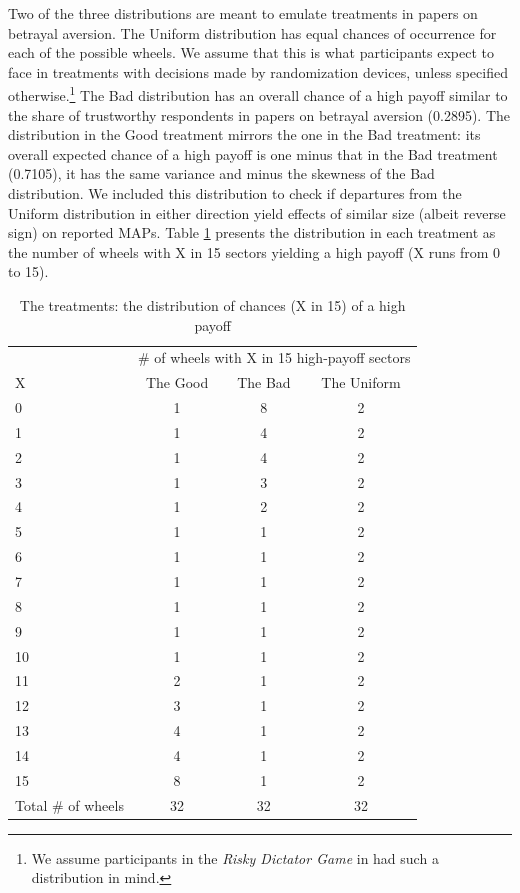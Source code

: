 Two of the three distributions are meant to emulate treatments in papers on betrayal aversion.
The Uniform distribution has equal chances of occurrence for each of the possible wheels.
We assume that this is what participants expect to face in treatments with decisions made by randomization devices, unless specified otherwise.\footnote{
We assume participants in the \textit{Risky Dictator Game} in \cite{Bohnet2004} had such a distribution in mind.
}
The Bad distribution has an overall chance of a high payoff similar to the share of trustworthy respondents in papers on betrayal aversion (0.2895).
The distribution in the Good treatment mirrors the one in the Bad treatment: its overall expected chance of a high payoff is one minus that in the Bad treatment (0.7105), it has the same variance and minus the skewness of the Bad distribution.
We included this distribution to check if departures from the Uniform distribution in either direction yield effects of similar size (albeit reverse sign) on reported MAPs.
Table \ref{tab:distr} presents the distribution in each treatment as the number of wheels with X in 15 sectors yielding a high payoff (X runs from 0 to 15).


\begin{table}[htbp]
\centering \caption{The treatments: the distribution of chances (X in 15) of a high payoff}\label{tab:distr}
\begin{threeparttable}
\begin{tabular}
   {@{}
	l
	*3c
	@{}
	}
\toprule
	&	\multicolumn{3}{c}{\# of wheels with X in 15 high-payoff sectors}\\
	\cmidrule{2-4}
X 	&	{The Good}&{The Bad}&	{The Uniform}\\
\cmidrule{2-4}
0	&	1&       8&	2\\
1	&	1&       4&	2\\
2	&	1&       4&	2\\
3	&	1&       3&	2\\
4	&	1&       2&	2\\
5	&	1&       1&	2\\
6	&	1&       1&	2\\
7	&	1&       1&	2\\
8	&	1&       1&	2\\
9	&	1&       1&	2\\
10	&	1&       1&	2\\
11	&	2&       1&	2\\
12	&	3&       1&	2\\
13	&	4&       1&	2\\
14	&	4&       1&	2\\
15	&	8&       1&	2\\
\midrule
Total \# of wheels	&	32&       32&	32\\
\bottomrule

\end{tabular}
\end{threeparttable}
\end{table}

